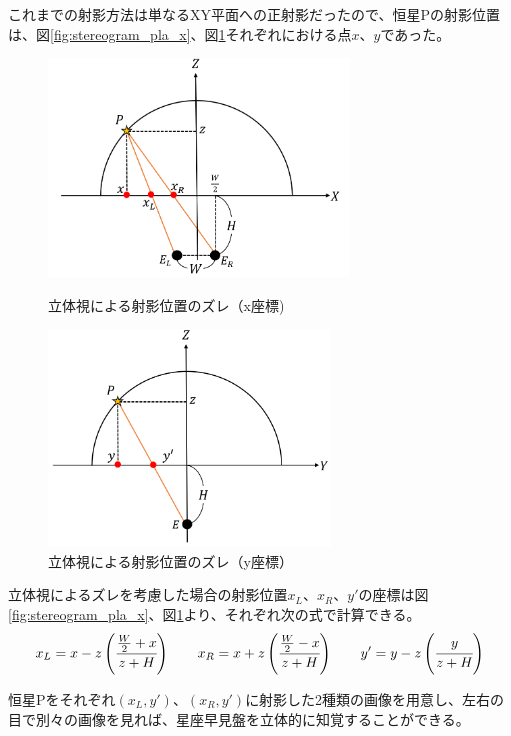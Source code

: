 \documentclass[../main]{subfiles}
\begin{document}
これまでの射影方法は単なるXY平面への正射影だったので、恒星Pの射影位置は、図\ref{fig:stereogram_pla_x}、図\ref{fig:stereogram_pla_y}それぞれにおける点$x$、$y$であった。
\begin{figure}[H]
  \centering
  \begin{minipage}[b]{0.48\linewidth}
    \centering
    \includegraphics[width=8cm]{sections/Fujisawa/image/stereogram_pla_x.PNG}
    \caption{立体視による射影位置のズレ（x座標)}
    \label{fig:stereogram_pla_x}
  \end{minipage}
  \begin{minipage}[b]{0.48\linewidth}
    \centering
    \includegraphics[width=7.5cm]{sections/Fujisawa/image/stereogram_pla_y.PNG}
    \caption{立体視による射影位置のズレ（y座標）}
    \label{fig:stereogram_pla_y}
  \end{minipage}
\end{figure}
立体視によるズレを考慮した場合の射影位置$x_L$、$x_R$、$y'$の座標は図\ref{fig:stereogram_pla_x}、図\ref{fig:stereogram_pla_y}より、それぞれ次の式で計算できる。
\begin{eqnarray*}
  x_L = x - z\left( \cfrac{\frac{W}{2} + x }{z+H} \right)\ \ \ \ \ \ x_R = x + z\left( \cfrac{\frac{W}{2} - x }{z+H} \right) \ \ \ \ \  \ y' = y - z\left( \cfrac{y}{z+H} \right)
\end{eqnarray*}

恒星Pをそれぞれ$(x_L, y')$、$(x_R, y')$に射影した2種類の画像を用意し、左右の目で別々の画像を見れば、星座早見盤を立体的に知覚することができる。
\end{document}
